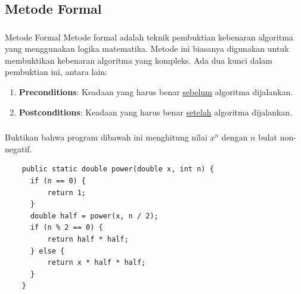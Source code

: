 \documentclass{../praktikum-ppt}
\begin{document}
    \subsection{Metode Formal}
    \begin{frame}
      \frametitle{\insertsection}
      \framesubtitle{\insertsubsection}
      \begin{block}{Metode Formal}
        Metode formal adalah teknik pembuktian kebenaran algoritma yang menggunakan logika matematika. Metode ini biasanya digunakan untuk membuktikan kebenaran algoritma yang kompleks. Ada dua kunci dalam pembuktian ini, antara lain:
        \begin{enumerate}
          \item \textbf{Preconditions}: Keadaan yang harus benar \underline{sebelum} algoritma dijalankan.
          \item \textbf{Postconditions}: Keadaan yang harus benar \underline{setelah} algoritma dijalankan.
        \end{enumerate}
      \end{block}
    \end{frame}

    \begin{frame}[fragile]
      \frametitle{\insertsection}
      \framesubtitle{\insertsubsection}
      \begin{contoh}
        Buktikan bahwa program dibawah ini menghitung nilai $x^n$ dengan $n$ bulat non-negatif.
      \end{contoh}
      \begin{lstlisting}
    public static double power(double x, int n) {
      if (n == 0) {
          return 1;
      }
      double half = power(x, n / 2);
      if (n % 2 == 0) {
          return half * half; 
      } else {
          return x * half * half; 
      }
    }
      \end{lstlisting}
    \end{frame}
\end{document}

